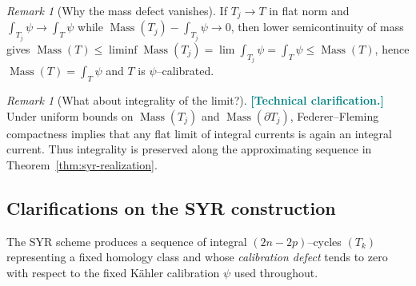 \documentclass[11pt]{article}
\newcommand{\REVMZ}[1]{\textcolor{teal}{#1}}  %
\numberwithin{equation}{section}  %
\theoremstyle{plain}
\theoremstyle{definition}
\theoremstyle{remark}
\newtheorem{remark}[theorem]{Remark}
\DeclareMathOperator{\Mass}{Mass}
\begin{document}
\begin{remark}[Why the mass defect vanishes]\label{rem:mass-vanishes}
If $T_j\to T$ in flat norm and $\int_{T_j}\psi\to \int_T\psi$ while $\Mass(T_j)-\int_{T_j}\psi\to 0$,
then lower semicontinuity of mass gives $\Mass(T)\le \liminf\Mass(T_j)=\lim\int_{T_j}\psi=\int_T\psi\le \Mass(T)$,
hence $\Mass(T)=\int_T\psi$ and $T$ is $\psi$--calibrated.
\end{remark}



\begin{remark}[What about integrality of the limit?]\label{rem:what-about-integrality}
\REVMZ{\textbf{[Technical clarification.]}}
Under uniform bounds on $\Mass(T_j)$ and $\Mass(\partial T_j)$, Federer--Fleming compactness \REVMZ{\cite[Thm~4.2.17]{Fed69}} implies that any flat limit of integral
currents is again an integral current.  Thus integrality is preserved along the approximating sequence in Theorem~\ref{thm:syr-realization}.
\end{remark}





\subsection*{Clarifications on the SYR construction}

The SYR scheme produces a sequence of integral $(2n-2p)$--cycles $(T_k)$ representing a fixed
homology class and whose \emph{calibration defect} tends to zero with respect to the fixed
K\"ahler calibration $\psi$ used throughout.
\end{document}
